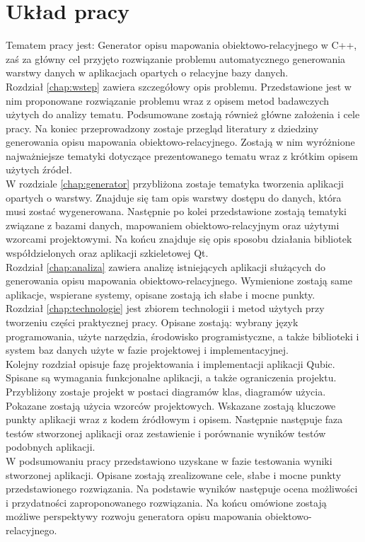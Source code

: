 \documentclass[12pt]{report}
\begin{document}
\section{Układ pracy}
Tematem pracy jest: Generator opisu mapowania obiektowo-relacyjnego w C++, zaś za główny cel przyjęto rozwiązanie problemu
automatycznego generowania warstwy danych w aplikacjach opartych o relacyjne bazy danych. \\
Rozdział \ref{chap:wstep} zawiera szczegółowy opis problemu. Przedstawione jest w nim proponowane rozwiązanie problemu 
wraz z opisem metod badawczych użytych do analizy tematu. Podsumowane zostają również główne założenia i cele pracy.
Na koniec przeprowadzony zostaje przegląd literatury z dziedziny generowania opisu mapowania obiektowo-relacyjnego. Zostają w nim wyróżnione
najważniejsze tematyki dotyczące prezentowanego tematu wraz z krótkim opisem użytych źródeł.  \\
W rozdziale \ref{chap:generator} przybliżona zostaje tematyka tworzenia aplikacji opartych o warstwy. Znajduje się tam opis warstwy dostępu do danych, która musi zostać wygenerowana. Następnie po kolei przedstawione zostają tematyki związane z bazami danych, mapowaniem obiektowo-relacyjnym oraz użytymi wzorcami projektowymi. Na końcu znajduje się opis sposobu działania bibliotek współdzielonych oraz aplikacji szkieletowej Qt. \\
Rozdział \ref{chap:analiza} zawiera analizę istniejących aplikacji służących do generowania opisu mapowania obiektowo-relacyjnego. Wymienione zostają same aplikacje, wspierane systemy, opisane zostają ich słabe i mocne punkty. \\
Rozdział \ref{chap:technologie} jest zbiorem technologii i metod użytych przy tworzeniu części praktycznej pracy. Opisane zostają: wybrany język programowania, użyte narzędzia, środowisko programistyczne, a także biblioteki i system baz danych użyte w fazie projektowej i implementacyjnej. \\
Kolejny rozdział opisuje fazę projektowania i implementacji aplikacji Qubic. Spisane są wymagania funkcjonalne aplikacji, a także ograniczenia projektu. Przybliżony zostaje projekt w postaci diagramów klas, diagramów użycia. Pokazane zostają użycia wzorców projektowych. Wskazane zostają kluczowe punkty aplikacji wraz z kodem źródłowym i opisem. Następnie następuje faza testów stworzonej aplikacji oraz zestawienie i porównanie wyników testów podobnych aplikacji. \\
W podsumowaniu pracy przedstawiono uzyskane w fazie testowania wyniki stworzonej aplikacji. Opisane zostają zrealizowane cele, słabe i mocne punkty przedstawionego rozwiązania. Na podstawie wyników następuje ocena możliwości i przydatności zaproponowanego rozwiązania. Na końcu omówione zostają możliwe perspektywy rozwoju generatora opisu mapowania obiektowo-relacyjnego.
\end{document}
